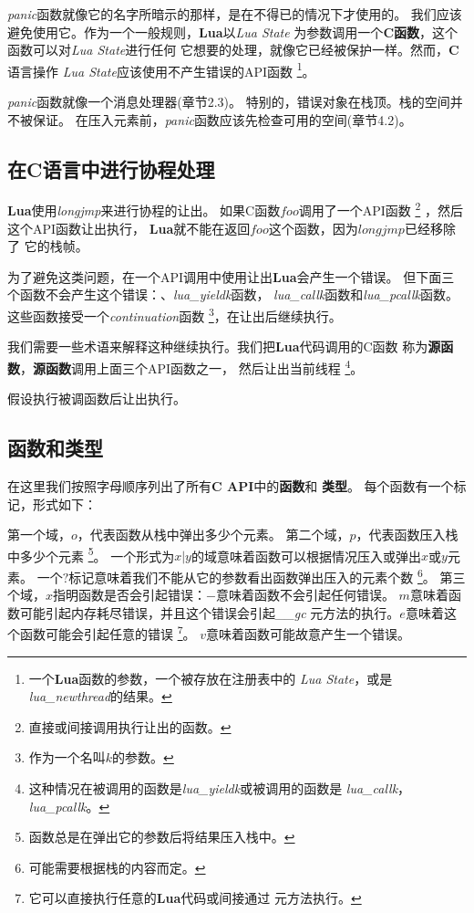 \documentclass{ctexart}
\begin{document}
\emph{panic}函数就像它的名字所暗示的那样，是在不得已的情况下才使用的。
我们应该避免使用它。作为一个一般规则，\textbf{Lua}以\emph{Lua State}
为参数调用一个\textbf{C函数}，这个函数可以对\emph{Lua State}进行任何
它想要的处理，就像它已经被保护一样。然而，\textbf{C}语言操作
\emph{Lua State}应该使用不产生错误的API函数
\footnote{一个\textbf{Lua}函数的参数，一个被存放在注册表中的
\emph{Lua State}，或是\emph{lua\_newthread}的结果。}。

\emph{panic}函数就像一个消息处理器(章节2.3)。
特别的，错误对象在栈顶。栈的空间并不被保证。
在压入元素前，\emph{panic}函数应该先检查可用的空间(章节4.2)。

\subsection{在C语言中进行协程处理}

\textbf{Lua}使用\emph{longjmp}来进行协程的让出。
如果C函数$foo$调用了一个API函数
\footnote{直接或间接调用执行让出的函数。}
，然后这个API函数让出执行，
\textbf{Lua}就不能在返回$foo$这个函数，因为$longjmp$已经移除了
它的栈帧。

为了避免这类问题，在一个API调用中使用让出\textbf{Lua}会产生一个错误。
但下面三个函数不会产生这个错误：、\emph{lua\_yieldk}函数，
\emph{lua\_callk}函数和\emph{lua\_pcallk}函数。
这些函数接受一个\emph{continuation}函数
\footnote{作为一个名叫$k$的参数。}，在让出后继续执行。

我们需要一些术语来解释这种继续执行。我们把\textbf{Lua}代码调用的C函数
称为\textbf{源函数}，\textbf{源函数}调用上面三个API函数之一，
然后让出当前线程
\footnote{这种情况在被调用的函数是\emph{lua\_yieldk}或被调用的函数是
\emph{lua\_callk}，\emph{lua\_pcallk}。}。

假设执行被调函数后让出执行。

\subsection{函数和类型}

在这里我们按照字母顺序列出了所有\textbf{C API}中的\textbf{函数}和
\textbf{类型}。
每个函数有一个标记，形式如下：

第一个域，$o$，代表函数从栈中弹出多少个元素。
第二个域，$p$，代表函数压入栈中多少个元素
\footnote{函数总是在弹出它的参数后将结果压入栈中。}。
一个形式为$x|y$的域意味着函数可以根据情况压入或弹出$x$或$y$元素。
一个$?$标记意味着我们不能从它的参数看出函数弹出压入的元素个数
\footnote{可能需要根据栈的内容而定。}。
第三个域，$x$指明函数是否会引起错误：$-$意味着函数不会引起任何错误。
$m$意味着函数可能引起内存耗尽错误，并且这个错误会引起\emph{\_\_gc}
元方法的执行。$e$意味着这个函数可能会引起任意的错误
\footnote{它可以直接执行任意的\textbf{Lua}代码或间接通过
元方法执行。}。
$v$意味着函数可能故意产生一个错误。
\end{document}
